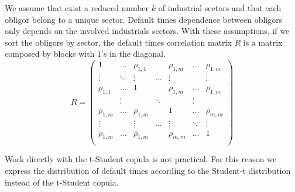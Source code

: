 \documentclass[11pt,fleqn]{book} %
\begin{document}
We assume that exist a reduced number $k$ of industrial sectors and that
each obligor belong to a unique sector. Default times dependence between 
obligors only depends on the involved industrials sectors. With these
assumptions, if we sort the obligors by sector, the default times
correlation matrix $R$ is a matrix composed by blocks with $1$'s in the 
diagonal.
\begin{displaymath}
R =
\left(
\begin{array}{ccccccc}
1           & \dots    & \rho_{1,1}  &                & \rho_{1,m}  & \dots      & \rho_{1,m}  \\
\vdots      & \ddots   & \vdots      &      \dots     & \vdots      &            & \vdots      \\
\rho_{1,1}  & \dots    & 1           &                & \rho_{1,m}  & \dots      & \rho_{1,m}  \\

            &  \vdots  &             &      \ddots    &             & \vdots     &             \\

\rho_{1,m}  & \dots    & \rho_{1,m}  &                & 1           & \dots      & \rho_{m,m}  \\
\vdots      &          & \vdots      &      \dots     & \vdots      & \ddots     & \vdots      \\
\rho_{1,m}  & \dots    & \rho_{1,m}  &                & \rho_{m,m}  & \dots      & 1           \\
\end{array}
\right)
\end{displaymath}

Work directly with the t-Student copula is not practical. For this reason 
we express the distribution of default times according to the Student-t 
distribution instead of the t-Student copula.
\end{document}

